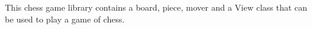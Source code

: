 This chess game library contains a board, piece, mover and a View class that can be used to play a game of chess. 
